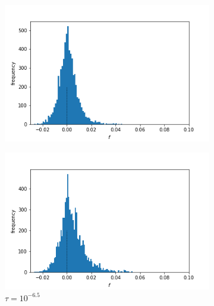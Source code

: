 \documentclass{article}
\begin{document}
\begin{figure}[h]
	\centering
	\begin{subfigure}[t]{0.24\linewidth}
		\centering
		\includegraphics[width = 1.0\linewidth, trim={5 5 40 30}, clip=true]{figures/tau5e7_selection_hist2.png}
		\label{fig:t7}	
	\end{subfigure}
	\hspace{0.01\linewidth}
	\begin{subfigure}[t]{0.24\linewidth}
		\centering
		\includegraphics[width = 1.0\linewidth, trim={5 5 40 30}, clip=true]{figures/tau5e5_selection_hist2.png}
		\caption{$\tau = 10^{-6.5}$}
		\label{fig:t65}
	\end{subfigure}
	\begin{subfigure}[t]{0.24\linewidth}
		\centering

\end{subfigure}
\end{figure}
\end{document}

